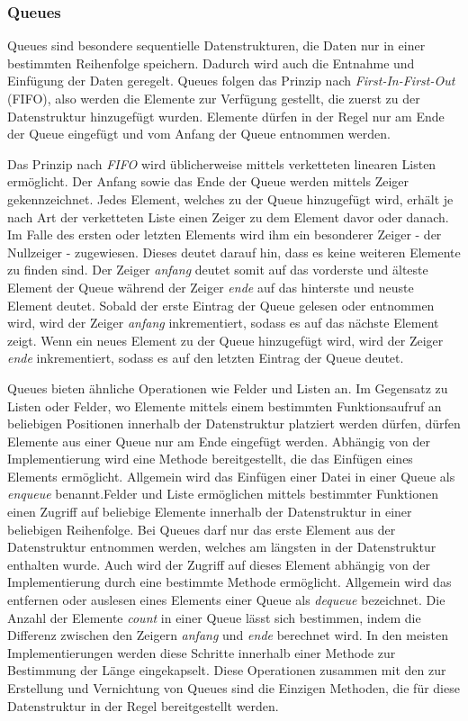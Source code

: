\subsubsection{Queues}
Queues sind besondere sequentielle Datenstrukturen, die Daten nur in einer bestimmten Reihenfolge speichern. Dadurch wird auch die Entnahme und Einfügung der Daten geregelt. Queues folgen das Prinzip nach \textit{First-In-First-Out} (FIFO), also werden die Elemente zur Verfügung gestellt, die zuerst zu der Datenstruktur hinzugefügt wurden. Elemente dürfen in der Regel nur am Ende der Queue eingefügt und vom Anfang der Queue entnommen werden. \autocite[371]{gumm_band_2016}

Das Prinzip nach \textit{FIFO} wird üblicherweise mittels verketteten linearen Listen ermöglicht. Der Anfang sowie das Ende der Queue werden mittels Zeiger gekennzeichnet. Jedes Element, welches zu der Queue hinzugefügt wird, erhält je nach Art der verketteten Liste einen Zeiger zu dem Element davor oder danach. Im Falle des ersten oder letzten Elements wird ihm ein besonderer Zeiger - der Nullzeiger - zugewiesen. Dieses deutet darauf hin, dass es keine weiteren Elemente zu finden sind. Der Zeiger \textit{anfang} deutet somit auf das vorderste und älteste Element der Queue während der Zeiger \textit{ende} auf das hinterste und neuste Element deutet. Sobald der erste Eintrag der Queue gelesen oder entnommen wird, wird der Zeiger \textit{anfang} inkrementiert, sodass es auf das nächste Element zeigt. Wenn ein neues Element zu der Queue hinzugefügt wird, wird der Zeiger \textit{ende} inkrementiert, sodass es auf den letzten Eintrag der Queue deutet. \autocite[48-49]{ollmert_datenstrukturen_2020} \autocite[371]{gumm_band_2016}

Queues bieten ähnliche Operationen wie Felder und Listen an. Im Gegensatz zu Listen oder Felder, wo Elemente mittels einem bestimmten Funktionsaufruf an beliebigen Positionen innerhalb der Datenstruktur platziert werden dürfen, dürfen Elemente aus einer Queue nur am Ende eingefügt werden. Abhängig von der Implementierung wird eine Methode bereitgestellt, die das Einfügen eines Elements ermöglicht. Allgemein wird das Einfügen einer Datei in einer Queue als \textit{enqueue} benannt.Felder und Liste ermöglichen mittels bestimmter Funktionen einen Zugriff auf beliebige Elemente innerhalb der Datenstruktur in einer beliebigen Reihenfolge. Bei Queues darf nur das erste Element aus der Datenstruktur entnommen werden, welches am längsten in der Datenstruktur enthalten wurde. Auch wird der Zugriff auf dieses Element abhängig von der Implementierung durch eine bestimmte Methode ermöglicht. Allgemein wird das entfernen oder auslesen eines Elements einer Queue als \textit{dequeue} bezeichnet. Die Anzahl der Elemente \textit{count} in einer Queue lässt sich bestimmen, indem die Differenz zwischen den Zeigern \textit{anfang} und \textit{ende} berechnet wird. In den meisten Implementierungen werden diese Schritte innerhalb einer Methode zur Bestimmung der Länge eingekapselt. Diese Operationen zusammen mit den zur Erstellung und Vernichtung von Queues sind die Einzigen Methoden, die für diese Datenstruktur in der Regel bereitgestellt werden. \autocite[71-72]{hubwieser_fundamente_2015} \autocite[371]{gumm_band_2016}

